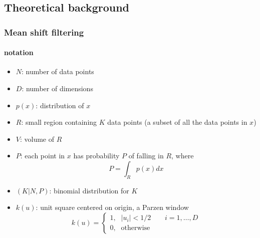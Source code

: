 \subsection{Theoretical background}
\begin{frame}
\frametitle{Mean shift filtering}
\framesubtitle{notation}
\logoCSIPCPL\mypagenum
	\begin{itemize}
		\item {\color{red}$N$}: number of data points
		\item {\color{red}$D$}: number of dimensions
	 	\item {\color{red}$p(x)$}: distribution of {\color{red}$x$}
		\item {\color{red}$R$}: small region containing {\color{red}$K$} data points (a subset of all the data points in $x$)
		\item {\color{red}$V$}: volume of $R$
		\item {\color{red}$P$}: each point in $x$ has probability $P$ of falling in $R$, where
			\begin{equation*}
				P=\int_R p(x)dx
			\end{equation*}
		\item {\color{red}$(K|N,P)$}: binomial distribution for $K$
		\item {\color{red} $k(u)$}: unit square centered on origin, a Parzen window
			\begin{equation*}
				k(u) = 
				\left\{ 
				\begin{array}{rl}
					1\text{,} &  |u_i|<1/2 \ \ \ \ \ \ \ \ \ i=1,\ldots, D\\ 
					0\text{,} &  \mbox{otherwise}
				\end{array}
				\right.
			\end{equation*}
	\end{itemize}
\end{frame}




